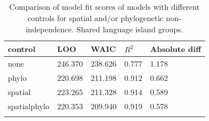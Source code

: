 \begin{longtable}{p{2cm}p{2cm}p{2cm}p{2cm}p{2cm}}
  \toprule
control & LOO & WAIC & $R^2$ & Absolute diff \\ 
  \midrule
none & 246.370 & 238.626 & 0.777 & 1.178 \\ 
  phylo & 220.698 & 211.198 & 0.912 & 0.662 \\ 
  spatial & 223.265 & 211.328 & 0.914 & 0.589 \\ 
  spatialphylo & 220.353 & 209.940 & 0.919 & 0.578 \\ 
   \bottomrule
\caption{Comparison of model fit scores of models with different controls for spatial and/or phylogenetic non-independence. Shared language island groups.} 
\label{model_fit_score_table_medium}
\end{longtable}
